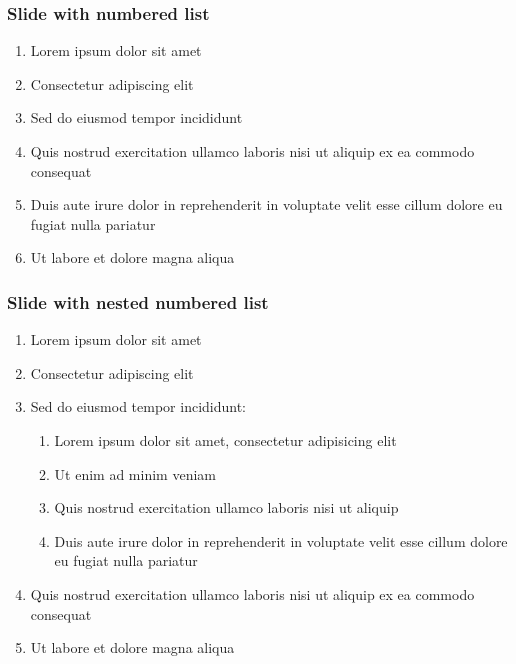 \documentclass[11pt,xcolor={dvipsnames},hyperref={pdftex,pdfpagemode=UseNone,hidelinks,pdfdisplaydoctitle=true},usepdftitle=false]{beamer}
\begin{document}
\begin{frame}
\frametitle{Slide with numbered list}
\begin{enumerate}
\item Lorem ipsum dolor sit amet
\item Consectetur adipiscing elit
\item Sed do eiusmod tempor incididunt
\item Quis nostrud exercitation ullamco laboris nisi ut aliquip ex ea commodo consequat
\item Duis aute irure dolor in reprehenderit in voluptate velit esse cillum dolore eu fugiat nulla pariatur
\item Ut labore et dolore magna aliqua
\end{enumerate}
\end{frame}

\begin{frame}
\frametitle{Slide with nested numbered list}
\begin{enumerate}
\item Lorem ipsum dolor sit amet
\item Consectetur adipiscing elit
\item Sed do eiusmod tempor incididunt:
\begin{enumerate}
\item Lorem ipsum dolor sit amet, consectetur adipisicing elit
\item Ut enim ad minim veniam
\item Quis nostrud exercitation ullamco laboris nisi ut aliquip
\item Duis aute irure dolor in reprehenderit in voluptate velit esse cillum dolore eu fugiat nulla pariatur
\end{enumerate}
\item Quis nostrud exercitation ullamco laboris nisi ut aliquip ex ea commodo consequat
\item Ut labore et dolore magna aliqua
\end{enumerate}
\end{frame}

\begin{frame}
\end{frame}
\end{document}
